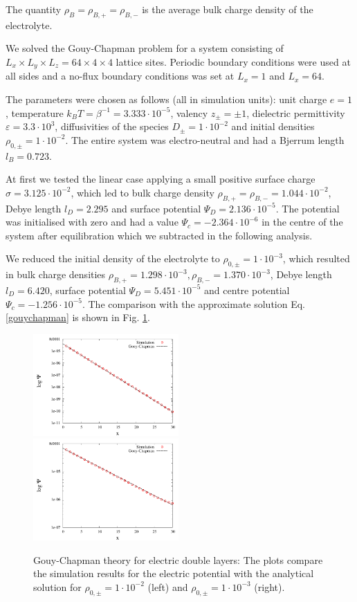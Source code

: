 \documentclass[aps,pre,preprint,groupedaddress]{revtex4-1}
\newcommand{\e}[1]{\cdot10^{#1}}
\begin{document}
The quantity $\rho_B=\rho_{B,+}=\rho_{B,-}$ is 
the average bulk charge density of the electrolyte.

We solved the Gouy-Chapman problem for a 
system consisting of $L_x \times L_y \times L_z=64\times4\times4$
lattice sites. Periodic boundary conditions were used at all sides 
and a no-flux boundary conditions was set at $L_x=1$ and $L_x=64$.
 
The parameters were chosen as follows (all in simulation units):
unit charge $e=1$, temperature $k_B T=\beta^{-1}=3.333\e{-5}$, valency $z_{\pm}=\pm1$, 
dielectric permittivity $\varepsilon=3.3\e{3}$, diffusivities 
of the species $D_{\pm}=1\e{-2}$ and initial densities $\rho_{0,\pm}=1\e{-2}$.
The entire system was electro-neutral and had a Bjerrum length $l_B=0.723$.

At first we tested the linear case applying a small positive surface charge
$\sigma=3.125\e{-2}$, which led to bulk charge density $\rho_{B,+}=\rho_{B,-}=1.044\e{-2}$, 
Debye length $l_D=2.295$ and surface potential $\Psi_D=2.136\e{-5}$.
The potential was initialised with zero and had a value $\Psi_c=-2.364\e{-6}$ 
in the centre of the system after equilibration which we subtracted in the 
following analysis.

We reduced the initial density of the electrolyte to $\rho_{0,\pm}=1\e{-3}$,
which resulted in bulk charge densities  
$\rho_{B,+}=1.298\e{-3}, \rho_{B,-}=1.370\e{-3}$, 
Debye length $l_D=6.420$, surface potential $\Psi_D=5.451\e{-5}$
and centre potential $\Psi_c=-1.256\e{-5}$.
The comparison with the approximate solution Eq. \ref{gouychapman} is shown 
in Fig. \ref{fig1}.

\begin{figure}[h!t]
\includegraphics[width=0.495\textwidth]{test1.pdf}
\includegraphics[width=0.495\textwidth]{test2.pdf}
\caption{Gouy-Chapman theory for electric double layers: The plots compare the simulation results for the electric potential with the analytical solution for $\rho_{0,\pm}=1\e{-2}$ (left) and $\rho_{0,\pm}=1\e{-3}$ (right).} 
\label{fig1} 
\end{figure}
\end{document}
